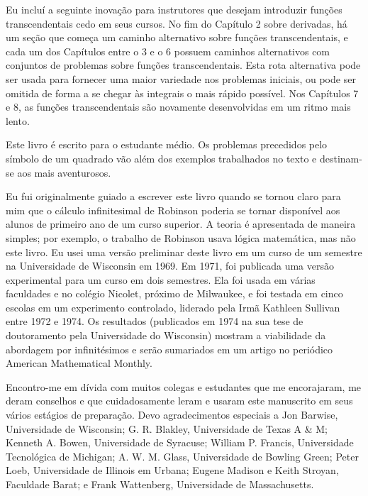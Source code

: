 \documentclass{svmono}
\begin{document}
Eu incluí a seguinte inovação para instrutores que desejam introduzir
funções transcendentais cedo em seus cursos. No fim do Capítulo 2 sobre
derivadas, há um seção que começa um caminho alternativo sobre funções
transcendentais, e cada um dos Capítulos entre o 3 e o 6 possuem
caminhos alternativos com conjuntos de problemas sobre funções
transcendentais. Esta rota alternativa pode ser usada para fornecer
uma maior variedade nos problemas iniciais, ou pode ser omitida de
forma a se chegar às integrais o mais rápido possível. Nos Capítulos
7 e 8, as funções transcendentais são novamente desenvolvidas em um
ritmo mais lento.

Este livro é escrito para o estudante médio. Os problemas precedidos pelo
símbolo de um quadrado vão além dos exemplos trabalhados no texto e
destinam-se aos mais aventurosos.

Eu fui originalmente guiado a escrever este livro quando se tornou claro
para mim que o cálculo infinitesimal de Robinson poderia se tornar
disponível aos alunos de primeiro ano de um curso superior. A teoria é
apresentada de maneira simples; por exemplo, o trabalho de Robinson
usava lógica matemática, mas não este livro. Eu usei uma versão preliminar
deste livro em um curso de um semestre na Universidade de Wisconsin em
1969. Em 1971, foi publicada uma versão experimental para um curso em
dois semestres. Ela foi usada em várias faculdades e no colégio Nicolet,
próximo de Milwaukee, e foi testada em cinco escolas em um experimento
controlado, liderado pela Irmã Kathleen Sullivan entre 1972 e 1974. Os
resultados (publicados em 1974 na sua tese de doutoramento pela Universidade
do Wisconsin) mostram a viabilidade da abordagem por infinitésimos e serão
sumariados em um artigo no periódico American Mathematical Monthly.

Encontro-me em dívida com muitos colegas e estudantes que me encorajaram,
me deram conselhos e que cuidadosamente leram e usaram este manuscrito
em seus vários estágios de preparação. Devo agradecimentos especiais a
Jon Barwise, Universidade de Wisconsin; G. R. Blakley, Universidade de
Texas A \& M; Kenneth A. Bowen, Universidade de Syracuse; William P.
Francis, Universidade Tecnológica de Michigan; A. W. M. Glass,
Universidade de Bowling Green; Peter Loeb, Universidade de Illinois em
Urbana; Eugene Madison e Keith Stroyan, Faculdade Barat; e Frank Wattenberg,
Universidade de Massachusetts.
\end{document}

